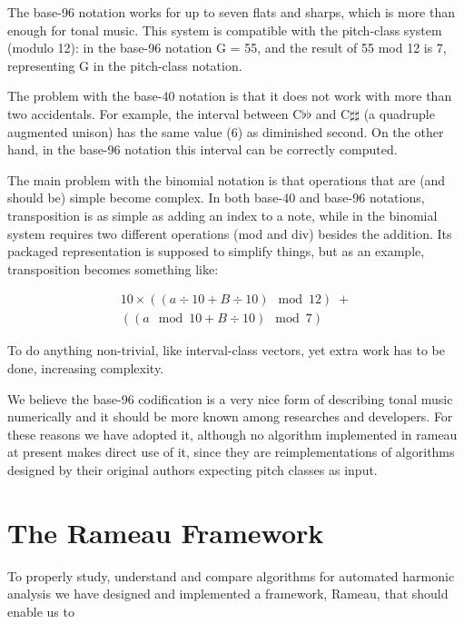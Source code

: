 \documentclass{article}
\newcounter{notacounter}
\newcommand{\nota}[1]{
  \addtocounter{notacounter}{1}
  \textcolor{red}{[nota \arabic{notacounter}: #1]}
}
\begin{document}
The base-96 notation works for up to seven flats and sharps, which is
more than enough for tonal music. This system is compatible with the
pitch-class system (modulo 12): in the base-96 notation G = 55, and
the result of 55 mod 12 is 7, representing G in the pitch-class
notation. 

The problem with the base-40 notation is that it does not work with
more than two accidentals. For example, the interval between
C$\flat\flat$ and C$\sharp\sharp$ (a quadruple augmented unison) has
the same value (6) as diminished second. On the other hand, in the
base-96 notation this interval can be correctly computed.

The main problem with the binomial notation is that operations that
are (and should be) simple become complex. In both base-40 and base-96
notations, transposition is as simple as adding an index to a note,
while in the binomial system requires two different operations (mod
and div) besides the addition. Its packaged representation is supposed
to simplify things, but as an example, transposition becomes something
like:

\begin{eqnarray}
10\times((a \div 10 + B \div 10) \mod 12)\; + \nonumber \\
((a \mod 10 + B \div 10) \mod 7)
\end{eqnarray}

To do anything non-trivial, like interval-class vectors, yet extra
work has to be done, increasing complexity.

We believe the base-96 codification is a very nice form of describing
tonal music numerically and it should be more known among researches
and developers. For these reasons we have adopted it, although no
algorithm implemented in rameau at present makes direct use of it,
since they are reimplementations of algorithms designed by their
original authors expecting pitch classes as input.

\section{The Rameau Framework}
\label{sec:system}

To properly study, understand and compare algorithms for automated
harmonic analysis we have designed and implemented a framework,
Rameau, that should enable us to
\end{document}
